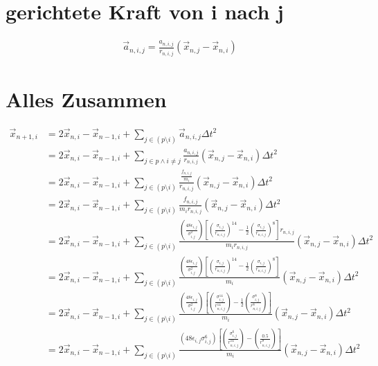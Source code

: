 \documentclass{article}
\begin{document}
\section*{gerichtete Kraft von i nach j}
\begin{align*}
	\vec{a}_{n,i,j}=\frac{a_{n,i,j}}{r_{n,i,j}}\left(\vec{x}_{n,j}-\vec{x}_{n,i}\right)
\end{align*}
\newpage
\section*{Alles Zusammen}
\begin{align}
	\vec{x}_{n+1,i}&=2\vec{x}_{n,i}-\vec{x}_{n-1,i}+\sum_{j\in (p\setminus i)}\vec{a}_{n,i,j}\Delta t^2\\
	&=2\vec{x}_{n,i}-\vec{x}_{n-1,i}+\sum_{j\in p \wedge i\neq j}\frac{a_{n,i,j}}{r_{n,i,j}}\left(\vec{x}_{n,j}-\vec{x}_{n,i}\right)\Delta t^2\\
	&=2\vec{x}_{n,i}-\vec{x}_{n-1,i}+\sum_{j\in (p\setminus i)}\frac{\frac{f_{n,i,j}}{m_i}}{r_{n,i,j}}\left(\vec{x}_{n,j}-\vec{x}_{n,i}\right)\Delta t^2\\
	&=2\vec{x}_{n,i}-\vec{x}_{n-1,i}+\sum_{j\in (p\setminus i)}\frac{f_{n,i,j}}{m_ir_{n,i,j}}\left(\vec{x}_{n,j}-\vec{x}_{n,i}\right)\Delta t^2\\
	&=2\vec{x}_{n,i}-\vec{x}_{n-1,i}+\sum_{j\in (p\setminus i)}\frac{\left(\frac{48\epsilon_{i,j}}{\sigma_{i,j}^2}\right)\left[\left(\frac{\sigma_{i,j}}{r_{n,i,j}}\right)^{14}-\frac{1}{2}\left(\frac{\sigma_{i,j}}{r_{n,i,j}}\right)^8\right]r_{n,i,j}}{m_ir_{n,i,j}}\left(\vec{x}_{n,j}-\vec{x}_{n,i}\right)\Delta t^2\\
	&=2\vec{x}_{n,i}-\vec{x}_{n-1,i}+\sum_{j\in (p\setminus i)}\frac{\left(\frac{48\epsilon_{i,j}}{\sigma_{i,j}^2}\right)\left[\left(\frac{\sigma_{i,j}}{r_{n,i,j}}\right)^{14}-\frac{1}{2}\left(\frac{\sigma_{i,j}}{r_{n,i,j}}\right)^8\right]}{m_i}\left(\vec{x}_{n,j}-\vec{x}_{n,i}\right)\Delta t^2\\
	&=2\vec{x}_{n,i}-\vec{x}_{n-1,i}+\sum_{j\in (p\setminus i)}\frac{\left(\frac{48\epsilon_{i,j}}{\sigma_{i,j}^2}\right)\left[\left(\frac{\sigma_{i,j}^{14}}{r_{n,i,j}^{14}}\right)-\frac{1}{2}\left(\frac{\sigma_{i,j}^8}{r_{n,i,j}^8}\right)\right]}{m_i}\left(\vec{x}_{n,j}-\vec{x}_{n,i}\right)\Delta t^2\\
	&=2\vec{x}_{n,i}-\vec{x}_{n-1,i}+\sum_{j\in (p\setminus i)}\frac{\left(48\epsilon_{i,j}\sigma_{i,j}^{6}\right)\left[\left(\frac{\sigma_{i,j}^{6}}{r_{n,i,j}^{14}}\right)-\left(\frac{0.5}{r_{n,i,j}^8}\right)\right]}{m_i}\left(\vec{x}_{n,j}-\vec{x}_{n,i}\right)\Delta t^2\\

\end{align}
\end{document}
